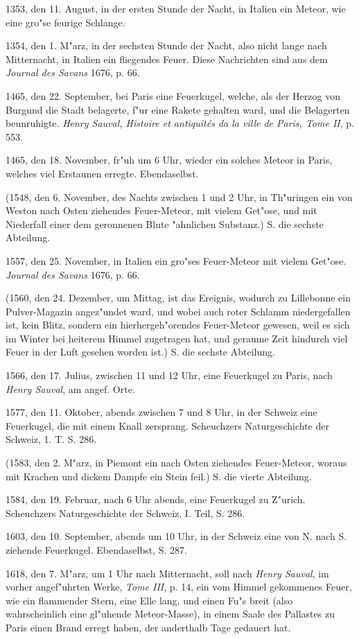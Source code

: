 \documentclass[a4paper, 11pt, oneside, polutonikogreek, german]{article}
\begin{document}
1353, den 11. August, in der ersten Stunde der Nacht, in Italien ein Meteor, wie eine gro"se feurige Schlange.

1354, den 1. M"arz, in der sechsten Stunde der Nacht, also nicht lange nach Mitternacht, in Italien ein fliegendes Feuer. Diese Nachrichten sind aus dem \emph{Journal des Savans} 1676, p. 66.

1465, den 22. September, bei Paris eine Feuerkugel, welche, als der Herzog von Burgund die Stadt belagerte, f"ur eine Rakete gehalten ward, und die Belagerten beunruhigte. \emph{Henry Sauval, Histoire et antiquités da la ville de Paris, Tome II}, p. 553.

1465, den 18. November, fr"uh um 6 Uhr, wieder ein solches Meteor in Paris, welches viel Erstaunen erregte. Ebendaselbst.

(1548, den 6. November, des Nachts zwischen 1 und 2 Uhr, in Th"uringen ein von Weston nach Osten ziehendes Feuer-Meteor, mit vielem Get"ose, und mit Niederfall einer dem geronnenen Blute "ahnlichen Substanz.) S. die sechste Abteilung.

1557, den 25. November, in Italien ein gro"ses Feuer-Meteor mit vielem Get"ose. \emph{Journal des Savans} 1676, p. 66.

(1560, den 24. Dezember, um Mittag, ist das Ereignis, wodurch zu Lillebonne ein Pulver-Magazin angez"undet ward, und wobei auch roter Schlamm niedergefallen ist, kein Blitz, sondern ein hierhergeh"orendes Feuer-Meteor gewesen, weil es sich im Winter bei heiterem Himmel zugetragen hat, und geraume Zeit hindurch viel Feuer in der Luft gesehen worden ist.) S. die sechste Abteilung.

1566, den 17. Julius, zwischen 11 und 12 Uhr, eine Feuerkugel zu Paris, nach \emph{Henry Sauval}, am angef. Orte.

1577, den 11. Oktober, abends zwischen 7 und 8 Uhr, in der Schweiz eine Feuerkugel, die mit einem Knall zersprang. Scheuchzers Naturgeschichte der Schweiz, 1. T. S. 286.

(1583, den 2. M"arz, in Piemont ein nach Osten ziehendes Feuer-Meteor, woraus mit Krachen und dickem Dampfe ein Stein feil.) S. die vierte Abteilung.

1584, den 19. Februar, nach 6 Uhr abends, eine Feuerkugel zu Z"urich. Scheuchzers Naturgeschichte der Schweiz, I. Teil, S. 286.

1603, den 10. September, abends um 10 Uhr, in der Schweiz eine von N. nach S. ziehende Feuerkugel. Ebendaselbst, S. 287.

1618, den 7. M"arz, um 1 Uhr nach Mitternacht, soll nach \emph{Henry Sauval}, im vorher angef"uhrten Werke, \emph{Tome III}, p. 14, ein vom Himmel gekommenes Feuer, wie ein flammender Stern, eine Elle lang, und einen Fu"s breit (also wahrscheinlich eine gl"uhende Meteor-Masse), in einem Saale des Pallastes zu Paris einen Brand erregt haben, der anderthalb Tage gedauert hat.
\end{document}
